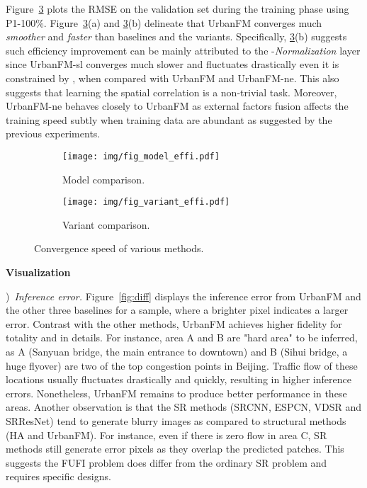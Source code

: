 \noindent Figure~\ref{fig:efficiency} plots the RMSE on the validation set during the training phase using P1-100\%. Figure~\ref{fig:efficiency}(a) and \ref{fig:efficiency}(b) delineate that UrbanFM converges much \textit{smoother} and \textit{faster} than baselines and the variants. Specifically, \ref{fig:efficiency}(b) suggests such efficiency improvement can be mainly attributed to the -\textit{Normalization} layer since UrbanFM-sl converges much slower and fluctuates drastically even it is constrained by , when compared with UrbanFM and UrbanFM-ne. This also suggests that learning the spatial correlation is a non-trivial task. Moreover, UrbanFM-ne behaves closely to UrbanFM as external factors fusion affects the training speed subtly when training data are abundant as suggested by the previous experiments.
\begin{figure}[!h]
	\centering
	\vspace{-1em}
	\begin{subfigure}[b]{0.225\textwidth}
		\texttt{[image: img/fig\_model\_effi.pdf]}	
		\caption{\label{fig:effi1}Model comparison.}
	\end{subfigure}
	\hspace{1mm}
	\begin{subfigure}[b]{0.220\textwidth}
		\texttt{[image: img/fig\_variant\_effi.pdf]}
		\caption{\label{fig:effi2}Variant comparison.}
	\end{subfigure}
	\vspace{-1em}
	\caption{Convergence speed of various methods.}
	\label{fig:efficiency}
\end{figure}


\vspace{1mm}
\noindent\textbf{Visualization}

)~\textit{Inference error.} Figure~\ref{fig:diff} displays the inference error  from UrbanFM and the other three baselines for a sample, where a brighter pixel indicates a larger error. Contrast with the other methods, UrbanFM achieves higher fidelity for totality and in details. For instance, area A and B are "hard area" to be inferred, as A (Sanyuan bridge, the main entrance to downtown) and B (Sihui bridge, a huge flyover) are two of the top congestion points in Beijing. Traffic flow of these locations usually fluctuates drastically and quickly, resulting in higher inference errors. Nonetheless, UrbanFM remains to produce better performance in these areas. Another observation is that the SR methods (SRCNN, ESPCN, VDSR and SRResNet) tend to generate blurry images as compared to structural methods (HA and UrbanFM). For instance, even if there is zero flow in area C, SR methods still generate error pixels as they overlap the predicted patches. This suggests the FUFI problem does differ from the ordinary SR problem and requires specific designs.


